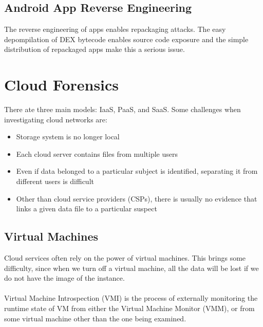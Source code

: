 \documentclass[10pt,a4paper]{report}
\begin{document}
\subsection{Android App Reverse Engineering}
The reverse engineering of apps enables repackaging attacks. The easy depompilation of DEX bytecode enables source code exposure and the simple distribution of repackaged apps make this a serious issue.
\section{Cloud Forensics}
There ate three main models: IaaS, PaaS, and SaaS. Some challenges when investigating cloud networks are:
\begin{itemize}
\item Storage system is no longer local
\item Each cloud server contains files from multiple users
\item Even if data belonged to a particular subject is identified, separating it from different users is difficult
\item Other than cloud service providers (CSPs), there is usually no evidence that links a given data file to a particular suspect
\end{itemize}
\subsection{Virtual Machines}
Cloud services often rely on the power of virtual machines. This brings some difficulty,  since when we turn off a virtual machine, all the data will be lost if we do not have the
image of the instance.\\
\\
Virtual Machine Introspection (VMI) is the process of externally monitoring the runtime state of VM from either the Virtual Machine Monitor (VMM), or from some virtual machine other than the one being examined.
\end{document}
